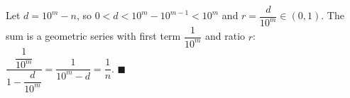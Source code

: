 Let $d=10^m-n$, so $0<d<10^m-10^{m-1}<10^m$ and $r=\dfrac d{10^m}\in(0,1)$. The sum is a geometric series with first term $\dfrac1{10^m}$ and ratio $r$: $\dfrac{\dfrac1{10^m}}{1-\dfrac d{10^m}}=\dfrac1{10^m-d}=\dfrac1n$. $\blacksquare$
